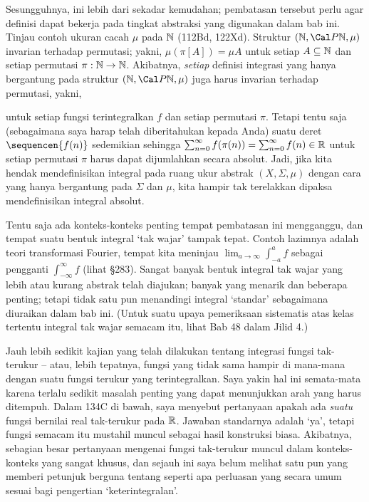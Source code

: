 {Sesungguhnya, ini lebih dari sekadar kemudahan; pembatasan tersebut perlu
agar definisi dapat bekerja pada tingkat abstraksi yang digunakan dalam
bab ini. Tinjau contoh ukuran cacah $\mu$ pada $\Bbb N$ (112Bd, 122Xd).
Struktur $(\Bbb N,\Cal P\Bbb N,\mu)$ invarian terhadap permutasi; yakni,
$\mu(\pi[A])=\mu A$ untuk setiap $A\subseteq\Bbb N$ dan setiap permutasi
$\pi:\Bbb N\to\Bbb N$. Akibatnya, {\it setiap} definisi integrasi yang
hanya bergantung pada struktur $(\Bbb N,\Cal P\Bbb N,\mu)$ juga harus
invarian terhadap permutasi, yakni,


\noindent untuk setiap fungsi terintegralkan $f$ dan setiap permutasi
$\pi$. Tetapi tentu saja (sebagaimana saya harap telah diberitahukan
kepada Anda) suatu deret $\sequencen{f(n)}$ sedemikian sehingga
$\sum_{n=0}^{\infty}f(\pi(n))=\sum_{n=0}^{\infty}f(n)\in\Bbb R$ untuk
setiap permutasi $\pi$ harus dapat dijumlahkan secara absolut. Jadi, jika
kita hendak mendefinisikan integral pada ruang ukur abstrak
$(X,\Sigma,\mu)$ dengan cara yang hanya bergantung pada $\Sigma$ dan
$\mu$, kita hampir tak terelakkan dipaksa mendefinisikan integral
absolut.

Tentu saja ada konteks-konteks penting tempat pembatasan ini mengganggu,
dan tempat suatu bentuk integral `tak wajar' tampak tepat. Contoh lazimnya
adalah teori transformasi Fourier, tempat kita meninjau
$\lim_{a\to\infty}\int_{-a}^af$ sebagai pengganti
$\int_{-\infty}^{\infty}f$ (lihat \S283). Sangat banyak bentuk integral
tak wajar yang lebih atau kurang abstrak telah diajukan; banyak yang menarik
dan beberapa penting; tetapi tidak satu pun menandingi integral `standar'
sebagaimana diuraikan dalam bab ini. (Untuk suatu upaya pemeriksaan
sistematis atas kelas tertentu integral tak wajar semacam itu, lihat Bab
48 dalam Jilid 4.)

Jauh lebih sedikit kajian yang telah dilakukan tentang integrasi
fungsi tak-terukur -- atau, lebih tepatnya, fungsi yang tidak sama hampir
di mana-mana dengan suatu fungsi terukur yang terintegralkan. Saya yakin
hal ini semata-mata karena terlalu sedikit masalah penting yang dapat
menunjukkan arah yang harus ditempuh. Dalam 134C di bawah, saya menyebut
pertanyaan apakah ada {\it suatu} fungsi bernilai real
tak-terukur pada $\Bbb R$. Jawaban standarnya adalah `ya', tetapi fungsi
semacam itu mustahil muncul sebagai hasil konstruksi biasa. Akibatnya,
sebagian besar pertanyaan mengenai fungsi tak-terukur muncul dalam
konteks-konteks yang sangat khusus, dan sejauh ini saya belum melihat
satu pun yang memberi petunjuk berguna tentang seperti apa perluasan yang
secara umum sesuai bagi pengertian `keterintegralan'.
}%

\discrpage
